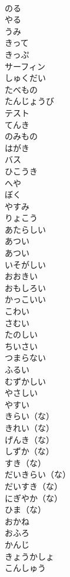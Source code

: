 \documentclass[8pt]{extreport}
\begin{document}
\begin{CJK}{UTF8}{min}
\\	のる	
\\	やる	
\\	うみ	
\\	きって	
\\	きっぷ	
\\	サーフィン	
\\	しゅくだい	
\\	たべもの	
\\	たんじょうび	
\\	テスト	
\\	てんき	
\\	のみもの	
\\	はがき	
\\	バス	
\\	ひこうき	
\\	へや	
\\	ぼく	
\\	やすみ	
\\	りょこう	
\\	あたらしい	
\\	あつい	
\\	あつい	
\\	いそがしい	
\\	おおきい	
\\	おもしろい	
\\	かっこいい	
\\	こわい	
\\	さむい	
\\	たのしい	
\\	ちいさい	
\\	つまらない	
\\	ふるい	
\\	むずかしい	
\\	やさしい	
\\	やすい	
\\	きらい（な）	
\\	きれい（な）	
\\	げんき（な）	
\\	しずか（な）	
\\	すき（な）	
\\	だいきらい（な）	
\\	だいすき（な）	
\\	にぎやか（な）	
\\	ひま（な）	
\\	おかね	
\\	おふろ	
\\	かんじ	
\\	きょうかしょ	
\\	こんしゅう	

\end{CJK}
\end{document}

